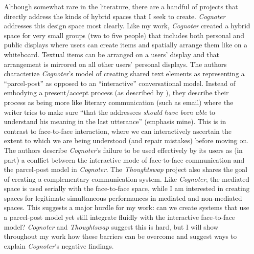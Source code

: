 Although somewhat rare in the literature, there are a handful of projects that directly address the kinds of hybrid spaces that I seek to create. \emph{Cognoter} \citep{Tatar:1991jq} addresses this design space most clearly. Like my work, \emph{Cognoter} created a hybrid space for very small groups (two to five people) that includes both personal and public displays where users can create items and spatially arrange them like on a whiteboard. Textual items can be arranged on a users' display and that arrangement is mirrored on all other users' personal displays. The authors characterize \emph{Cognoter}'s model of creating shared text elements as representing a ``parcel-post'' as opposed to an ``interactive'' conversational model. Instead of embodying a present/accept process (as described by \citep{Clark:1989uc}), they describe their process as being more like literary communication (such as email) where the writer tries to make sure ``that the addressees \emph{should have been able} to understand his meaning in the last utterance'' (emphasis mine). This is in contrast to face-to-face interaction, where we can interactively ascertain the extent to which we are being understood (and repair mistakes) before moving on. The authors describe \emph{Cognoter}'s failure to be used effectively by its users as (in part) a conflict between the interactive mode of face-to-face communication and the parcel-post model in \emph{Cognoter}. The \emph{Thoughtswap} project \citep{DickeyKurdziolek:2010wt} also shares the goal of creating a complementary communication system. Like \emph{Cognoter}, the mediated space is used serially with the face-to-face space, while I am interested in creating spaces for legitimate simultaneous performances in mediated and non-mediated spaces. This suggests a major hurdle for my work: can we create systems that use a parcel-post model yet still integrate fluidly with the interactive face-to-face model? \emph{Cognoter} and \emph{Thoughtswap} suggest this is hard, but I will show throughout my work how these barriers can be overcome and suggest ways to explain \emph{Cognoter}'s negative findings.




